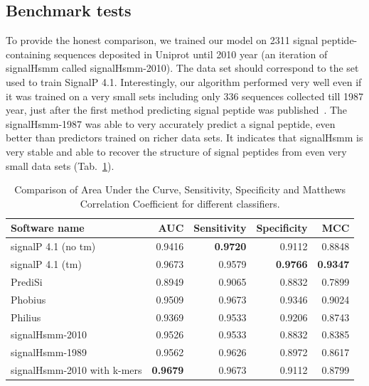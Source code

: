 \documentclass[fleqn,10pt,twoside]{gcb15submission}
\begin{document}
\subsection*{Benchmark tests}

To provide the honest comparison, we trained our model on 2311 signal peptide-containing sequences deposited in Uniprot until 2010 year (an iteration of signalHsmm called signalHsmm-2010). The data set should correspond to the set used to train SignalP 4.1. Interestingly, our algorithm performed very well even if it was trained on a very small sets including only 336 sequences collected till 1987 year, just after the first method predicting signal peptide was published~\citep{1986vonheijnea}. The signalHsmm-1987 was able to very accurately predict a signal peptide, even better than predictors trained on richer data sets. It indicates that signalHsmm is very stable and able to recover the structure of signal peptides from even very small data sets (Tab.~\ref{tab:bench2010}).

\begin{table}[ht]
\small
\centering
\caption{Comparison of Area Under the Curve, Sensitivity, Specificity and Matthews Correlation Coefficient for different classifiers.} 
\begin{tabular}{lrrrr}
  \toprule
Software name & AUC & Sensitivity & Specificity & MCC \\ 
  \midrule
signalP 4.1 (no tm) \citep{2011petersensignalp} & 0.9416 & \textbf{0.9720} & 0.9112 & 0.8848 \\ 
   \rowcolor[gray]{0.85}signalP 4.1 (tm) \citep{2011petersensignalp} & 0.9673 & 0.9579 & \textbf{0.9766} & \textbf{0.9347} \\ 
  PrediSi \citep{2004hillerpredisi} & 0.8949 & 0.9065 & 0.8832 & 0.7899 \\ 
   \rowcolor[gray]{0.85}Phobius \citep{2004klla} & 0.9509 & 0.9673 & 0.9346 & 0.9024 \\ 
  Philius \citep{2008reynoldstransmembrane} & 0.9369 & 0.9533 & 0.9206 & 0.8743 \\ 
   \rowcolor[gray]{0.85}signalHsmm-2010 & 0.9526 & 0.9533 & 0.8832 & 0.8385 \\ 
  signalHsmm-1989 & 0.9562 & 0.9626 & 0.8972 & 0.8617 \\ 
   \rowcolor[gray]{0.85}signalHsmm-2010 with k-mers & \textbf{0.9679} & 0.9673 & 0.9112 & 0.8799 \\ 
   \bottomrule
\end{tabular}
\label{tab:bench2010}
\end{table}
\end{document}
